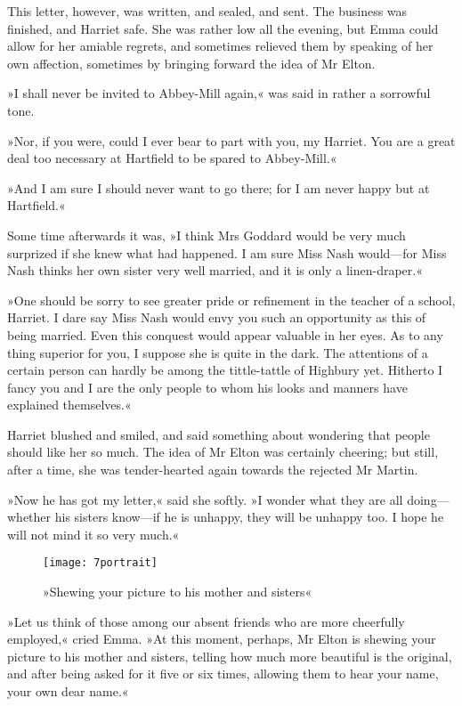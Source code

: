 This letter, however, was written, and sealed, and sent. The business was finished, and Harriet safe. She was rather low all the evening, but Emma could allow for her amiable regrets, and sometimes relieved them by speaking of her own affection, sometimes by bringing forward the idea of Mr Elton.

»I shall never be invited to Abbey-Mill again,« was said in rather a sorrowful tone.

»Nor, if you were, could I ever bear to part with you, my Harriet. You are a great deal too necessary at Hartfield to be spared to Abbey-Mill.«

»And I am sure I should never want to go there; for I am never happy but at Hartfield.«

Some time afterwards it was, »I think Mrs Goddard would be very much surprized if she knew what had happened. I am sure Miss Nash would—for Miss Nash thinks her own sister very well married, and it is only a linen-draper.«

»One should be sorry to see greater pride or refinement in the teacher of a school, Harriet. I dare say Miss Nash would envy you such an opportunity as this of being married. Even this conquest would appear valuable in her eyes. As to any thing superior for you, I suppose she is quite in the dark. The attentions of a certain person can hardly be among the tittle-tattle of Highbury yet. Hitherto I fancy you and I are the only people to whom his looks and manners have explained themselves.«

Harriet blushed and smiled, and said something about wondering that people should like her so much. The idea of Mr Elton was certainly cheering; but still, after a time, she was tender-hearted again towards the rejected Mr Martin.

»Now he has got my letter,« said she softly. »I wonder what they are all doing—whether his sisters know—if he is unhappy, they will be unhappy too. I hope he will not mind it so very much.«

\begin{figure}[tbph]
\centering
\texttt{[image: 7portrait]}
\caption{»Shewing your picture to his mother and sisters«}
\end{figure}

»Let us think of those among our absent friends who are more cheerfully employed,« cried Emma. »At this moment, perhaps, Mr Elton is shewing your picture to his mother and sisters, telling how much more beautiful is the original, and after being asked for it five or six times, allowing them to hear your name, your own dear name.«

